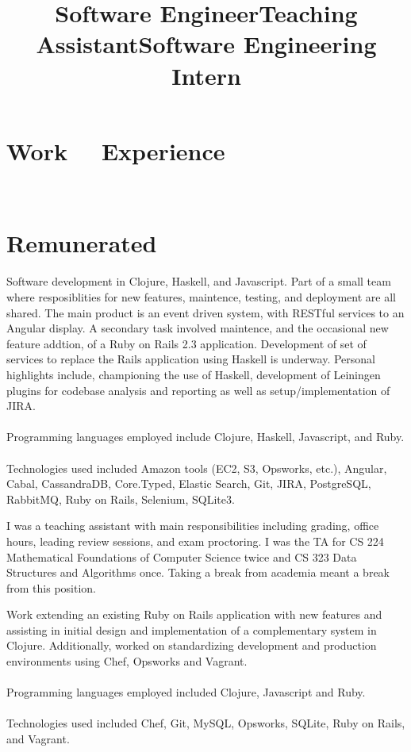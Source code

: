 \documentclass[margintitle,line]{res}
\renewcommand{\subsection}[1]{\section{\normalfont #1}}
\begin{document}
\begin{resume}
\section{Work \ \ Experience}
\ \\
\subsection{Remunerated}

\title{Software Engineer}
\begin{position}
  Software development in Clojure, Haskell, and Javascript. Part of a
  small team where resposiblities for new features, maintence,
  testing, and deployment are all shared. The main product is an event
  driven system, with RESTful services to an Angular display. A
  secondary task involved maintence, and the occasional new feature
  addtion, of a Ruby on Rails 2.3 application. Development of set of
  services to replace the Rails application using Haskell is underway.
  Personal highlights include, championing the use of Haskell,
  development of Leiningen plugins for codebase analysis and reporting
  as well as setup/implementation of JIRA.\\ \ \\
 Programming languages employed include Clojure, Haskell, Javascript,
 and Ruby. \\ \ \\
 Technologies used included Amazon tools (EC2, S3, Opsworks, etc.),
 Angular, Cabal, CassandraDB, Core.Typed, Elastic Search, Git, JIRA,
 PostgreSQL, RabbitMQ, Ruby on Rails, Selenium, SQLite3.
\end{position}

\title{Teaching Assistant}
\begin{position}
 I was a teaching assistant with main responsibilities including
 grading, office hours, leading review sessions, and exam
 proctoring. I was the TA for CS 224 Mathematical Foundations of
 Computer Science twice and CS 323 Data Structures and Algorithms
 once. Taking a break from academia meant a break from this position.
\end{position}

\title{Software Engineering Intern}
\begin{position}
 Work extending an existing Ruby on Rails application with new
 features and assisting in initial design and implementation of a
 complementary system in  Clojure. Additionally, worked on
 standardizing development and production environments using Chef,
 Opsworks and Vagrant. \\ \ \\
 Programming languages employed included Clojure, Javascript and Ruby. \\ \ \\
 Technologies used included Chef, Git, MySQL, Opsworks, SQLite,
 Ruby on Rails, and Vagrant.
\end{position}


\end{resume}
\end{document}
